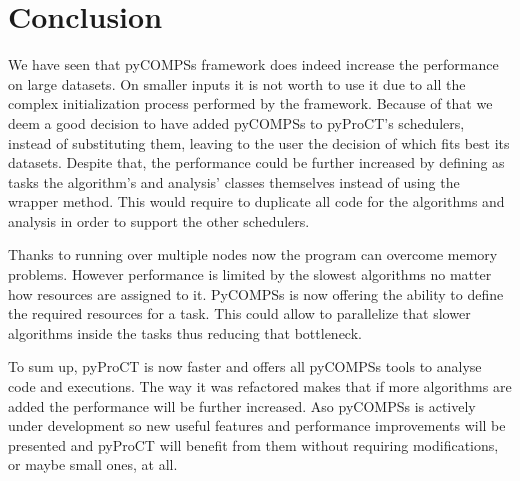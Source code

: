 \chapter{Conclusion}


We have seen that pyCOMPSs framework does indeed increase the performance on large datasets. On smaller inputs it is not worth to use it due to all the complex initialization process performed by the framework. Because of that we deem a good decision to have added pyCOMPSs to pyProCT's schedulers, instead of substituting them, leaving to the user the decision of which fits best its datasets. Despite that, the performance could be further increased by defining as tasks the algorithm's and analysis' classes themselves instead of using the wrapper method. This would require to duplicate all code for the algorithms and analysis in order to support the other schedulers.

Thanks to running over multiple nodes now the program can overcome memory problems. However performance is limited by the slowest algorithms no matter how resources are assigned to it. PyCOMPSs is now offering the ability to define the required resources for a task. This could allow to parallelize that slower algorithms inside the tasks thus reducing that bottleneck. 

To sum up, pyProCT is now faster and offers all pyCOMPSs tools to analyse code and executions. The way it was refactored makes that if more algorithms are added the performance will be further increased. Aso pyCOMPSs is actively under development so new useful features and performance improvements will be presented and pyProCT will benefit from them without requiring modifications, or maybe small ones, at all.




